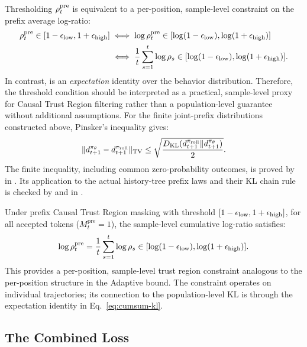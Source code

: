 \begin{remark}
\label{rem:prefix-proxy}
Thresholding $\rho_{t}^{\mathrm{pre}}$ is equivalent to a per-position, sample-level constraint on the prefix average log-ratio:
\begin{align*}
    \rho_{t}^{\mathrm{pre}} \in [1-\epsilon_{\mathrm{low}}, 1+\epsilon_{\mathrm{high}}]
    &\iff \log\rho_{t}^{\mathrm{pre}} \in [\log(1-\epsilon_{\mathrm{low}}), \log(1+\epsilon_{\mathrm{high}})]
    \\
    &\iff \frac{1}{t}\sum_{s=1}^{t}\log\rho_s \in [\log(1-\epsilon_{\mathrm{low}}), \log(1+\epsilon_{\mathrm{high}})].
\end{align*}
In contrast,  is an \emph{expectation} identity over the behavior distribution. Therefore, the threshold condition
should be interpreted as a practical, sample-level proxy for Causal Trust Region filtering rather than a population-level guarantee
without additional assumptions. For the finite joint-prefix distributions constructed above, Pinsker's inequality gives:
\begin{equation*}
    \|d_{t+1}^{\pi_{\theta}} - d_{t+1}^{\pi_{\mathrm{roll}}}\|_{\mathrm{TV}}
    \le \sqrt{\frac{D_{\mathrm{KL}}(d_{t+1}^{\pi_{\mathrm{roll}}} \| d_{t+1}^{\pi_{\theta}})}{2}}.
\end{equation*}
The finite inequality, including common zero-probability outcomes, is proved
by  in . Its application to the
actual history-tree prefix laws and their KL chain rule is checked by
 and  in
.
\end{remark}

\begin{remark}
\label{rem:per-position-trust}
Under prefix Causal Trust Region masking with threshold $[1-\epsilon_{\mathrm{low}}, 1+\epsilon_{\mathrm{high}}]$, for all accepted tokens ($M_t^{\mathrm{pre}} = 1$), the sample-level cumulative log-ratio satisfies:
\begin{equation*}
    \log\rho_{t}^{\mathrm{pre}}
    = \frac{1}{t}\sum_{s=1}^{t} \log\rho_s
    \in [\log(1-\epsilon_{\mathrm{low}}), \log(1+\epsilon_{\mathrm{high}})].
\end{equation*}
This provides a per-position, sample-level trust region constraint analogous to the per-position structure in the Adaptive bound. The constraint operates on individual trajectories; its connection to the population-level KL is through the expectation identity in Eq.~\eqref{eq:cumsum-kl}.
\end{remark}

\subsection{The Combined Loss}
\label{sec:combined-loss}


